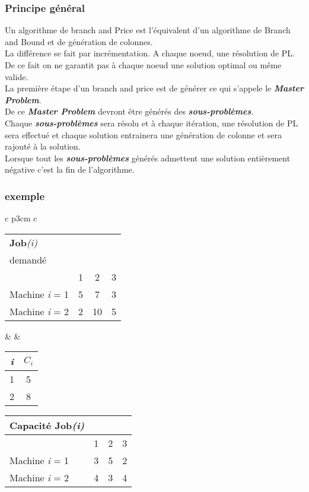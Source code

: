 \subsubsection{Principe général}
Un algorithme de branch and Price est l'équivalent d'un algorithme de Branch and Bound et de génération de colonnes. \\
La différence se fait par incrémentation. A chaque noeud, une résolution de PL. De ce fait on ne garantit pas à chaque noeud une solution optimal ou même valide. 
\\
La première étape d'un branch and price est de générer ce qui s'appele le \textbf{\textit{Master Problem}}.\\
De ce \textbf{\textit{Master Problem}} devront être générés des \textbf{\textit{sous-problèmes}}. \\
Chaque \textbf{\textit{sous-problèmes}} sera résolu et à chaque itération, une résolution de PL sera effectué et chaque solution entrainera une génération de colonne et sera rajouté à la solution. \\
Lorsque tout les \textbf{\textit{sous-problèmes}} générés admettent une solution entièrement négative c'est la fin de l'algorithme.


\subsubsection{exemple}
\begin{center}
\begin{tabular}{c p{3cm} c}
\begin{tabular}{  p{2.5cm} c c c}
\hline
\textbf{Job}\textit{(i)} \\demandé \\
\hline
 & 1 & 2 & 3 \\
 \hline
Machine \textit{i} = 1 & 5 & 7 & 3 \\
Machine \textit{i} = 2 & 2 & 10 & 5 \\
\hline
\end{tabular}

\vspace{1cm}
& &
\begin{tabular}{c c}
\hline
\textit{i} & $C_\textit{i}$\\
\hline
1 & 5 \\
\hline
2 & 8\\
\hline
\end{tabular}
\end{tabular}

\vspace{1cm}

\begin{tabular}{  p{2.5cm} c c c}
\hline
Capacité \textbf{Job}\textit{(i)} \\
\hline
 & 1 & 2 & 3 \\
 \hline
Machine \textit{i} = 1 & 3 & 5 & 2 \\
Machine \textit{i} = 2 & 4 & 3 & 4 \\
\hline
\end{tabular}
\end{center}
\vspace{1cm}

